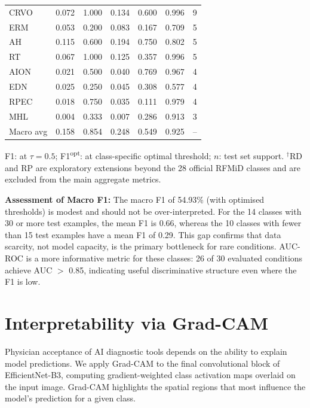 \documentclass[conference]{IEEEtran}
\begin{document}
\begin{table}[htbp]
\begin{tabular}{lrrrrrr}
CRVO          & 0.072 & 1.000 & 0.134 & 0.600 & 0.996 & 9   \\
ERM           & 0.053 & 0.200 & 0.083 & 0.167 & 0.709 & 5   \\
AH            & 0.115 & 0.600 & 0.194 & 0.750 & 0.802 & 5   \\
RT            & 0.067 & 1.000 & 0.125 & 0.357 & 0.996 & 5   \\
AION          & 0.021 & 0.500 & 0.040 & 0.769 & 0.967 & 4   \\
EDN           & 0.025 & 0.250 & 0.045 & 0.308 & 0.577 & 4   \\
RPEC          & 0.018 & 0.750 & 0.035 & 0.111 & 0.979 & 4   \\
MHL           & 0.004 & 0.333 & 0.007 & 0.286 & 0.913 & 3   \\
\midrule
Macro avg     & 0.158 & 0.854 & 0.248 & 0.549 & 0.925 & -- \\
\bottomrule
\end{tabular}
\vspace{1pt}
\footnotesize{F1: at $\tau{=}0.5$; F1\textsuperscript{opt}: at class-specific optimal threshold; $n$: test set support. $^\dagger$RD and RP are exploratory extensions beyond the 28 official RFMiD classes and are excluded from the main aggregate metrics.}
\end{table}

\textbf{Assessment of Macro F1:} The macro F1 of 54.93\% (with optimised thresholds) is modest and should not be over-interpreted. For the 14 classes with 30 or more test examples, the mean F1 is 0.66, whereas the 10 classes with fewer than 15 test examples have a mean F1 of 0.29. This gap confirms that data scarcity, not model capacity, is the primary bottleneck for rare conditions. AUC-ROC is a more informative metric for these classes: 26 of 30 evaluated conditions achieve AUC $>$ 0.85, indicating useful discriminative structure even where the F1 is low.


\section{Interpretability via Grad-CAM}
Physician acceptance of AI diagnostic tools depends on the ability to explain model predictions. We apply Grad-CAM \cite{selvaraju2017grad} to the final convolutional block of EfficientNet-B3, computing gradient-weighted class activation maps overlaid on the input image. Grad-CAM highlights the spatial regions that most influence the model's prediction for a given class.
\end{document}

